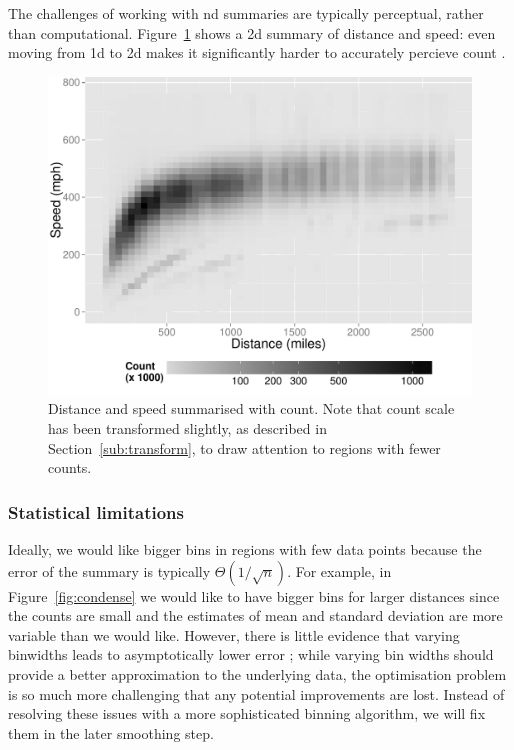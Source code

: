 \documentclass[journal]{vgtc}                %
\begin{document}
The challenges of working with nd summaries are typically perceptual, rather than computational. Figure~\ref{fig:condense-2d} shows a 2d summary of distance and speed: even moving from 1d to 2d makes it significantly harder to accurately percieve count \citep{cleveland:1984}.

\begin{figure}[htb]
 \centering
 \includegraphics[width=\linewidth]{condense-2d}
 \caption{Distance and speed summarised with count. Note that count scale has been transformed slightly, as described in Section~\ref{sub:transform}, to draw attention to regions with fewer counts.}
 \label{fig:condense-2d}
\end{figure}

\subsubsection{Statistical limitations}

Ideally, we would like bigger bins in regions with few data points because the error of the summary is typically $\Theta(1 / \sqrt{n})$. For example, in Figure~\ref{fig:condense} we would like to have bigger bins for larger distances since the counts are small and the estimates of mean and standard deviation are more variable than we would like. However, there is little evidence that varying binwidths leads to asymptotically lower error \citep{terrell:1992}; while varying bin widths should provide a better approximation to the underlying data, the optimisation problem is so much more challenging that any potential improvements are lost. Instead of resolving these issues with a more sophisticated binning algorithm, we will fix them in the later smoothing step.  
\end{document}
